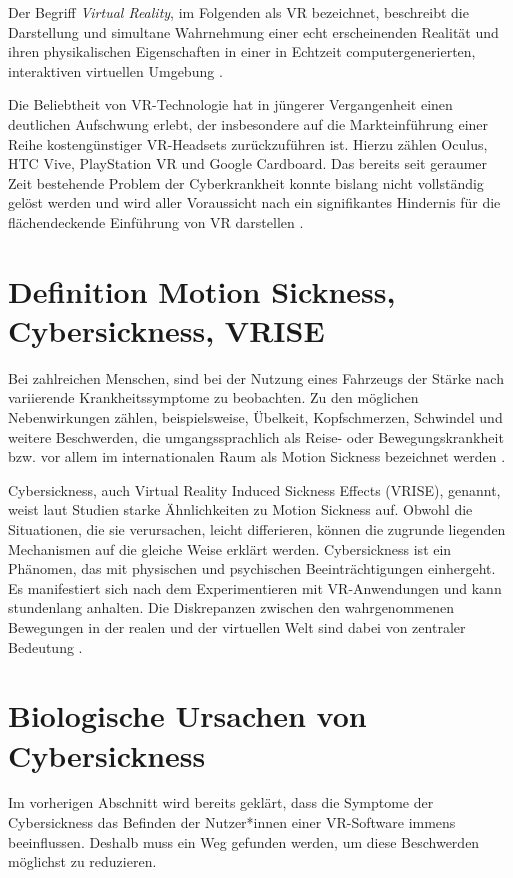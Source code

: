 Der Begriff \emph{Virtual Reality}, im Folgenden als VR bezeichnet, beschreibt die Darstellung und simultane Wahrnehmung einer echt erscheinenden Realität und ihren physikalischen Eigenschaften in einer in Echtzeit computergenerierten, interaktiven virtuellen Umgebung \cite{ParkS.-Y.;Koo2025}.

Die Beliebtheit von VR-Technologie hat in jüngerer Vergangenheit einen deutlichen Aufschwung erlebt, der insbesondere auf die Markteinführung einer Reihe kostengünstiger VR-Headsets zurückzuführen ist. Hierzu zählen Oculus, HTC Vive, PlayStation VR und Google Cardboard. Das bereits seit geraumer Zeit bestehende Problem der Cyberkrankheit konnte bislang nicht vollständig gelöst werden und wird aller Voraussicht nach ein signifikantes Hindernis für die flächendeckende Einführung von VR darstellen \cite{ParkS.-Y.;Koo2025}.

\section{Definition Motion Sickness, Cybersickness, VRISE}\label{sec:motionsickness}
Bei zahlreichen Menschen, sind bei der Nutzung eines Fahrzeugs der Stärke nach
variierende Krankheitssymptome zu beobachten. Zu den möglichen Nebenwirkungen zählen, beispielsweise, Übelkeit, Kopfschmerzen, Schwindel und weitere Beschwerden, die umgangssprachlich als Reise- oder Bewegungskrankheit bzw. vor allem im internationalen Raum als Motion Sickness bezeichnet werden \cite{Gavgani2018}.

Cybersickness, auch Virtual Reality Induced Sickness Effects (VRISE), genannt, weist laut Studien \cite{Gavgani2018} starke Ähnlichkeiten zu Motion Sickness auf. Obwohl die Situationen, die sie verursachen, leicht differieren, können die zugrunde liegenden Mechanismen auf die gleiche Weise erklärt werden. Cybersickness ist ein Phänomen, das mit physischen und psychischen Beeinträchtigungen einhergeht. Es manifestiert sich nach dem Experimentieren mit VR-Anwendungen und kann stundenlang anhalten. Die Diskrepanzen zwischen den wahrgenommenen Bewegungen in der realen und der virtuellen Welt sind dabei von zentraler Bedeutung \cite{Gavgani2018}.

\section{Biologische Ursachen von Cybersickness}
Im vorherigen Abschnitt wird bereits geklärt, dass die Symptome der Cybersickness das Befinden der Nutzer*innen einer VR-Software immens beeinflussen. Deshalb muss ein Weg gefunden werden, um diese Beschwerden möglichst zu reduzieren.

